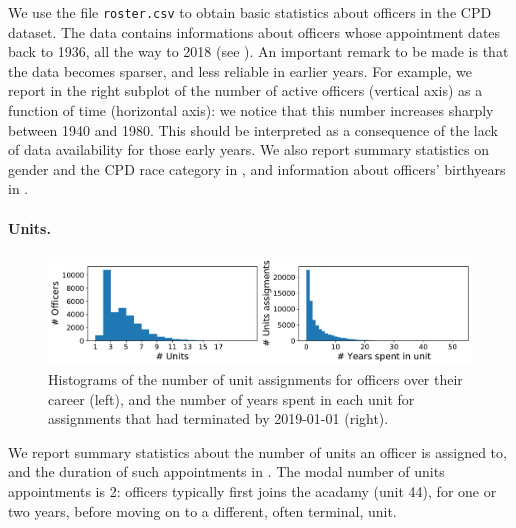 We use the file \texttt{roster.csv} to obtain basic statistics about officers in the CPD dataset. The data contains informations about officers whose appointment dates back to 1936, all the way to 2018 (see ). An important remark to be made is that the data becomes sparser, and less reliable in earlier years. For example, we report in the right subplot of  the number of active officers (vertical axis) as a function of time (horizontal axis): we notice that this number increases sharply between 1940 and 1980. This should be interpreted as a consequence of the lack of data availability for those early years. We also report summary statistics on gender and the CPD race category in , and information about officers' birthyears in .

\paragraph{Units.} 
\begin{figure}[t!] 
	\includegraphics[width=\textwidth]{figs/units_officers} 
	\caption{Histograms of the number of unit assignments for
officers over their career (left), and the number of years spent in each unit for assignments that had terminated by 2019-01-01 (right).}
\label{fig:units}
\end{figure}


We report summary statistics about the number of units an officer is assigned to, and the duration of such appointments in . The modal number of units appointments is 2: officers typically first joins the acadamy (unit 44), for one or two years, before moving on to a different, often terminal, unit. 
 
